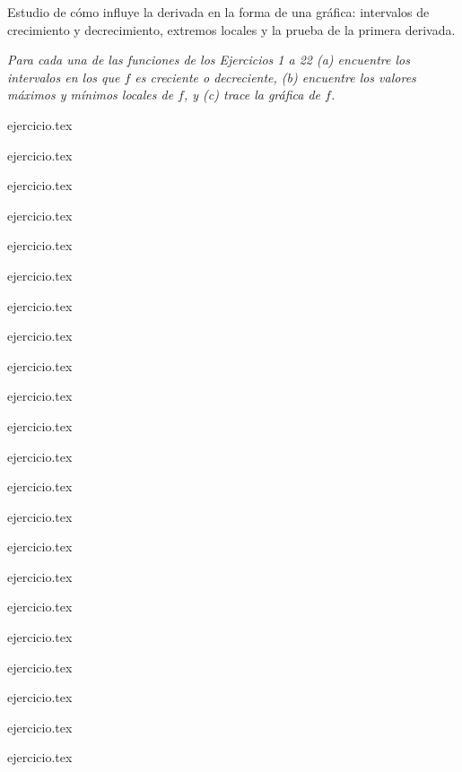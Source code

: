 
Estudio de cómo influye la derivada en la forma de una gráfica: intervalos de crecimiento y decrecimiento, extremos locales y la prueba de la primera derivada.

\noindent \textit{Para cada una de las funciones de los Ejercicios 1 a 22 (a) encuentre los intervalos en los que $f$ es creciente o decreciente, (b) encuentre los valores máximos y mínimos locales de $f$, y (c) trace la gráfica de $f$.}

\begin{enumerate}
    \begin{minipage}{0.45\textwidth}
    {ejercicio.tex}
    \addtocounter{enumi}{1}
    {ejercicio.tex}
    \addtocounter{enumi}{1}
    {ejercicio.tex}
    \addtocounter{enumi}{1}
    {ejercicio.tex}
    \addtocounter{enumi}{1}
    {ejercicio.tex}
    \addtocounter{enumi}{1}
    {ejercicio.tex}
    \addtocounter{enumi}{1}
    {ejercicio.tex}
    \addtocounter{enumi}{1}
    {ejercicio.tex}
    \addtocounter{enumi}{1}
    {ejercicio.tex}
    \addtocounter{enumi}{1}
    {ejercicio.tex}
    \addtocounter{enumi}{1}
    {ejercicio.tex}
    \end{minipage}%
    \begin{minipage}{0.45\textwidth}
    \setcounter{enumi}{1}
    {ejercicio.tex}
    \addtocounter{enumi}{1}
    {ejercicio.tex}
    \addtocounter{enumi}{1}
    {ejercicio.tex}
    \addtocounter{enumi}{1}
    {ejercicio.tex}
    \addtocounter{enumi}{1}
    {ejercicio.tex}
    \addtocounter{enumi}{1}
    {ejercicio.tex}
    \addtocounter{enumi}{1}
    {ejercicio.tex}
    \addtocounter{enumi}{1}
    {ejercicio.tex}
    \addtocounter{enumi}{1}
    {ejercicio.tex}
    \addtocounter{enumi}{1}
    {ejercicio.tex}
    \addtocounter{enumi}{1}
    {ejercicio.tex}
    \end{minipage}
\end{enumerate}

